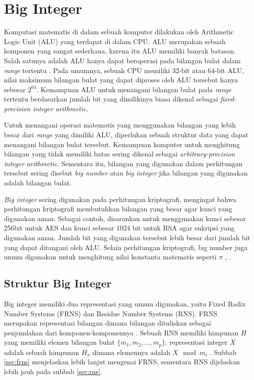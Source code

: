 \section{Big Integer}
  Komputasi matematis di dalam sebuah komputer dilakukan oleh Arithmetic Logic Unit (ALU) yang terdapat di dalam CPU. ALU merupakan sebuah komponen yang sangat sederhana, karena itu ALU memiliki banyak batasan. Salah satunya adalah ALU hanya dapat beroperasi pada bilangan bulat dalam \textit{range} tertentu \citep{comp_org_arch}. Pada umumnya, sebuah CPU memiliki 32-bit atau 64-bit ALU, nilai maksimum bilangan bulat yang dapat diproses oleh ALU tersebut hanya sebesar $2^{64}$. Kemampuan ALU untuk menangani bilangan bulat pada \textit{range} tertentu berdasarkan jumlah bit yang dimilikinya biasa dikenal sebagai \textit{fixed-precision integer arithmetic}.

  Untuk menangani operasi matematis yang menggunakan bilangan yang lebih besar dari \textit{range} yang dimiliki ALU, diperlukan sebuah struktur data yang dapat menangani bilangan bulat tersebut. Kemampuan komputer untuk menghitung bilangan yang tidak memiliki batas sering dikenal sebagai \textit{arbitrary-precision integer arithmetic}. Sementara itu, bilangan yang digunakan dalam perhitungan tersebut sering disebut \textit{big number} atau \textit{big integer} jika bilangan yang digunakan adalah bilangan bulat.

  \textit{Big integer} sering digunakan pada perhitungan kriptografi, mengingat bahwa perhitungan kriptografi membutuhkan bilangan yang besar agar kunci yang digunakan aman. Sebagai contoh, disarankan untuk menggunakan kunci sebesar 256bit untuk AES dan kunci sebesar 1024 bit untuk RSA \citep{key_suggestion} agar enkripsi yang digunakan aman. Jumlah bit yang digunakan tersebut lebih besar dari jumlah bit yang dapat ditangani oleh ALU. Selain perhitungan kriptografi, big number juga umum digunakan untuk menghitung nilai konstanta matematis seperti $\pi$ \citep{bn_pi}, .


  \subsection{Struktur Big Integer}

    Big integer memiliki dua representasi yang umum digunakan, yaitu Fixed Radix Number Systems (FRNS) dan Residue Number Systems (RNS). FRNS merupakan representasi bilangan dimana bilangan dituliskan sebagai penjumlahan dari komponen-komponennya \citep{modern_comp_math}. Sebuah RNS memiliki himpunan $H$ yang memiliki elemen bilangan bulat $\{m_1,m_2,...,m_p\}$, representasi integer $X$ adalah sebuah himpunan $H_x$ dimana elemennya adalah $X \mod m_i$ \citep{rns_survey}. Subbab \ref{sec:frns} menjelaskan lebih lanjut mengenai FRNS, sementara RNS dijelaskan lebih jauh pada subbab \ref{sec:rns}.


